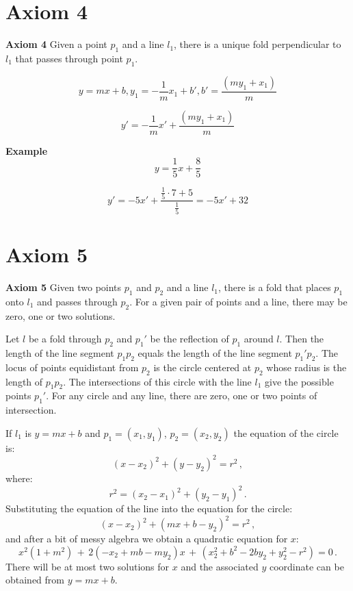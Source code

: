 \documentclass[11pt,a4paper]{article}
\newcommand*{\disfrac}[2]{\displaystyle\frac{#1}{#2}}
\begin{document}


\section{Axiom 4}


\textbf{Axiom 4} 
Given a point $p_1$ and a line $l_1$, there is a unique fold perpendicular to $l_1$ that passes through point $p_1$.

\[
y = mx + b,  y_1=-\disfrac{1}{m} x_1 + b', b'= \disfrac{(my_1+x_1)}{m}
\]

\[
y'=-\disfrac{1}{m} x' +\disfrac{(my_1+x_1)}{m}
\]

\textbf{Example}
\[
y = \disfrac{1}{5}x+\disfrac{8}{5}
\]

\[
y'=-5x' + \disfrac{\disfrac{1}{5}\cdot 7 + 5}{\disfrac{1}{5}}=-5x' + 32
\]



\section{Axiom 5}


\textbf{Axiom 5} 
Given two points $p_1$ and $p_2$ and a line $l_1$, there is a fold that places $p_1$ onto $l_1$ and passes through $p_2$. For a given pair of points and a line, there may be zero, one or two solutions.

Let $l$ be a fold through $p_2$ and $p_1'$ be the reflection of $p_1$ around $l$. Then the length of the line segment $p_1p_2$ equals the length of the line segment $p_1'p_2$. The locus of points equidistant from $p_2$ is the circle centered at $p_2$ whose radius is the length of $p_1p_2$. The intersections of this circle with the line $l_1$ give the possible points $p_1'$. For any circle and any line, there are zero, one or two points of intersection.

If $l_1$ is $y=mx + b$ and $p_1=(x_1,y_1)$,  $p_2=(x_2,y_2)$ the equation of the circle is:
\[
(x-x_2)^2 + (y-y_2)^2 = r^2\,,
\]
where:
\[
r^2= (x_2-x_1)^2 + (y_2-y_1)^2\,.
\]
Substituting the equation of the line into the equation for the circle:
\[
(x-x_2)^2+(mx+b-y_2)^2=r^2\,,
\]
and after a bit of messy algebra we obtain a quadratic equation for $x$:
\begin{equation}
x^2(1+m^2) \,+\, 2(-x_2+mb-my_2)x \,+\, (x_2^2 +b^2 - 2by_2+y_2^2-r^2)=0\,.\label{eq.intersections}
\end{equation}
There will be at most two solutions for $x$ and the associated $y$ coordinate can be obtained from $y=mx+b$.
\end{document}
